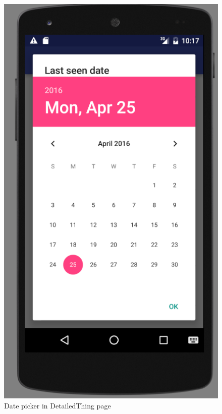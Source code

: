 \documentclass{article}
\begin{document}
\begin{figure}[h!]
	\centering
	\includegraphics[scale=0.7]{"datePicker"}
	\caption{Date picker in DetailedThing page}
	\label{fig:datePicker}
\end{figure}
\end{document}
